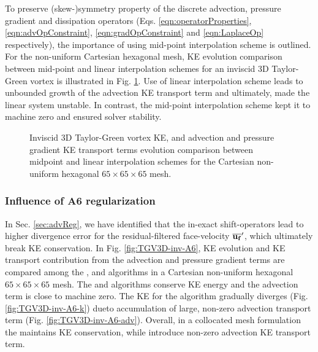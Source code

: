 To preserve (skew-)symmetry property of the discrete advection, pressure gradient and dissipation operators (Eqs. \eqref{eqn:operatorProperties}, \eqref{eqn:advOpConstraint}, \eqref{eqn:gradOpConstraint} and \eqref{eqn:LaplaceOp} respectively), the importance of using mid-point interpolation scheme is outlined. For the non-uniform Cartesian hexagonal mesh, KE evolution comparison between mid-point and linear interpolation schemes for an inviscid 3D Taylor-Green vortex is illustrated in Fig. \ref{fig:TGV3D-inv-hex}. Use of linear interpolation scheme leads to unbounded growth of the advection KE transport term and ultimately, made the linear system unstable. In contrast, the mid-point interpolation scheme kept it to machine zero and ensured solver stability.

\begin{figure}[!h]
\centering
{}
\caption{Inviscid 3D Taylor-Green vortex KE, and advection and pressure gradient KE transport terms evolution comparison between midpoint and linear interpolation schemes for the Cartesian non-uniform hexagonal $65 \times 65 \times 65$ mesh.} 
\label{fig:TGV3D-inv-hex}
\end{figure}



\clearpage
\subsubsection{Influence of A6 regularization}
\label{sec:A6KEconserv}

In Sec. \ref{sec:advReg}, we have identified that the in-exact shift-operators lead to higher divergence error for the residual-filtered face-velocity ${\overline{\mathbf{u_f}}}^{\prime}$, which ultimately break KE conservation. In Fig. \ref{fig:TGV3D-inv-A6}, KE evolution and KE transport contribution from the advection and pressure gradient terms are compared among the \spaece, \spaeceA and \spaeceAdivFree algorithms in a Cartesian non-uniform hexagonal $65 \times 65 \times 65$ mesh. The \spaeceAdivFree and \spaece algorithms conserve KE energy and the advection term is close to machine zero. The KE for the \spaeceA algorithm gradually diverges (Fig. \ref{fig:TGV3D-inv-A6-k}) dueto accumulation of large, non-zero advection transport term (Fig. \ref{fig:TGV3D-inv-A6-adv}). Overall, in a collocated mesh formulation the \spaeceAdivFree maintains KE conservation, while \spaeceA introduce non-zero advection KE transport term.


